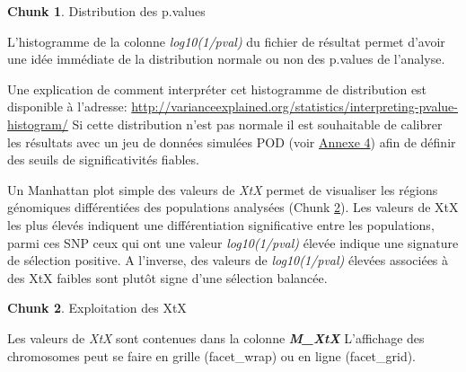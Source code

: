 \documentclass[
  openany]{book}
\newenvironment{Shaded}{\begin{snugshade}}{\end{snugshade}}
\newcommand{\AttributeTok}[1]{\textcolor[rgb]{0.13,0.29,0.53}{#1}}
\newcommand{\DecValTok}[1]{\textcolor[rgb]{0.00,0.00,0.81}{#1}}
\newcommand{\FloatTok}[1]{\textcolor[rgb]{0.00,0.00,0.81}{#1}}
\newcommand{\FunctionTok}[1]{\textcolor[rgb]{0.13,0.29,0.53}{\textbf{#1}}}
\newcommand{\NormalTok}[1]{#1}
\newcommand{\OtherTok}[1]{\textcolor[rgb]{0.56,0.35,0.01}{#1}}
\newcommand{\SpecialCharTok}[1]{\textcolor[rgb]{0.81,0.36,0.00}{\textbf{#1}}}
\newcommand{\StringTok}[1]{\textcolor[rgb]{0.31,0.60,0.02}{#1}}
\theoremstyle{definition}
\theoremstyle{definition}
\theoremstyle{definition}
\newtheorem{exercise}{Chunk}[chapter]
\theoremstyle{definition}
\theoremstyle{remark}
\begin{document}
\begin{exercise}
\protect\hypertarget{exr:chunk6}{}\label{exr:chunk6}{Distribution des p.values}
\end{exercise}

L'histogramme de la colonne \emph{log10(1/pval)} du fichier de résultat permet d'avoir une idée immédiate de la distribution normale ou non des p.values de l'analyse.

\begin{Shaded}
\end{Shaded}

Une explication de comment interpréter cet histogramme de distribution est disponible à l'adresse:
\url{http://varianceexplained.org/statistics/interpreting-pvalue-histogram/}
Si cette distribution n'est pas normale il est souhaitable de calibrer les résultats avec un jeu de données simulées POD (voir \protect\hyperlink{An4}{Annexe 4}) afin de définir des seuils de significativités fiables.

Un Manhattan plot simple des valeurs de \emph{XtX} permet de visualiser les régions génomiques différentiées des populations analysées (Chunk \ref{exr:chunk7}).
Les valeurs de XtX les plus élevés indiquent une différentiation significative entre les populations, parmi ces SNP ceux qui ont une valeur \emph{log10(1/pval)} élevée indique une signature de sélection positive. A l'inverse, des valeurs de \emph{log10(1/pval)} élevées associées à des XtX faibles sont plutôt signe d'une sélection balancée.

\begin{exercise}
\protect\hypertarget{exr:chunk7}{}\label{exr:chunk7}{Exploitation des XtX}
\end{exercise}

Les valeurs de \emph{XtX} sont contenues dans la colonne \textbf{\emph{M\_XtX}}
L'affichage des chromosomes peut se faire en grille (facet\_wrap) ou en ligne (facet\_grid).
\end{document}
